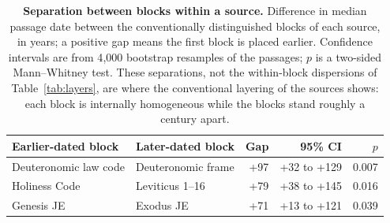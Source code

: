 \begin{table}[!ht]
\centering
\footnotesize
\caption{{\bf Separation between blocks within a source.}  Difference in median passage date between the conventionally distinguished blocks of each source, in years; a positive gap means the first block is placed earlier.  Confidence intervals are from 4{,}000 bootstrap resamples of the passages; $p$ is a two-sided Mann--Whitney test.  These separations, not the within-block dispersions of Table~\ref{tab:layers}, are where the conventional layering of the sources shows: each block is internally homogeneous while the blocks stand roughly a century apart.}
\label{tab:blocks}
\begin{tabular}{llrrr}
\toprule
\textbf{Earlier-dated block} & \textbf{Later-dated block} & \textbf{Gap} & \textbf{95\% CI} & \textbf{$p$} \\
\midrule
Deuteronomic law code & Deuteronomic frame & +97 & +32 to +129 & 0.007 \\
Holiness Code & Leviticus 1--16 & +79 & +38 to +145 & 0.016 \\
Genesis JE & Exodus JE & +71 & +13 to +121 & 0.039 \\
\bottomrule
\end{tabular}
\end{table}
